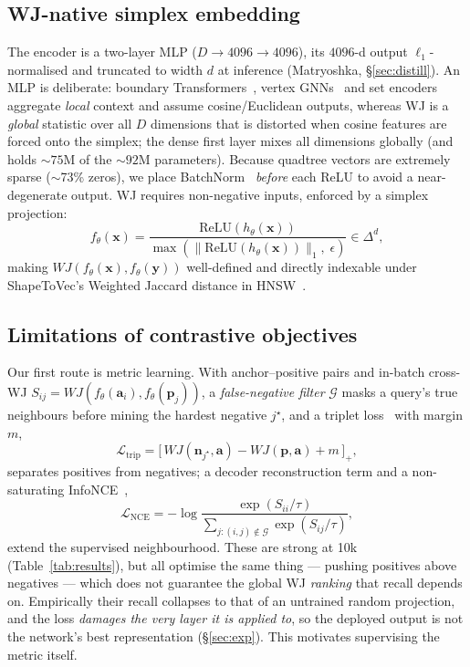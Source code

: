 \documentclass[sigconf]{acmart}
\begin{document}
\subsection{WJ-native simplex embedding}
\label{sec:embed}
The encoder is a two-layer MLP ($D\!\to\!4096\!\to\!4096$), its $4096$-d output
$\ell_1$-normalised and truncated to width $d$ at inference (Matryoshka,
\S\ref{sec:distill}). An MLP is deliberate: boundary Transformers~\cite{mai22}, vertex GNNs~\cite{polygongnn24}
and set encoders~\cite{deepsets17} aggregate \emph{local} context and assume
cosine/Euclidean outputs, whereas WJ is a \emph{global} statistic over all $D$
dimensions that is distorted when cosine features are forced onto the simplex; the
dense first layer mixes all dimensions globally (and holds ${\sim}75$M of the
${\sim}92$M parameters). Because quadtree vectors are extremely sparse
($\sim$73\% zeros), we place BatchNorm~\cite{ioffe15bn} \emph{before} each ReLU to
avoid a near-degenerate output. WJ requires non-negative inputs, enforced by a
simplex projection:
\begin{equation}
  f_\theta(\mathbf{x}) = \frac{\mathrm{ReLU}(h_\theta(\mathbf{x}))}
       {\max(\|\mathrm{ReLU}(h_\theta(\mathbf{x}))\|_1,\;\epsilon)} \in \Delta^{d},
  \label{eq:simplex}
\end{equation}
making $WJ(f_\theta(\mathbf{x}),f_\theta(\mathbf{y}))$ well-defined and directly
indexable under ShapeToVec's Weighted Jaccard distance in HNSW~\cite{shape2vec}.

\subsection{Limitations of contrastive objectives}
\label{sec:contrastive}
Our first route is metric learning. With anchor--positive pairs and in-batch
cross-WJ $S_{ij}=WJ(f_\theta(\mathbf{a}_i),f_\theta(\mathbf{p}_j))$, a
\emph{false-negative filter} $\mathcal{G}$ masks a query's true neighbours before
mining the hardest negative $j^\star$, and a triplet loss~\cite{schroff15} with
margin $m$,
\begin{equation}
  \mathcal{L}_{\mathrm{trip}}=\big[\,WJ(\mathbf{n}_{j^\star},\mathbf{a})
     -WJ(\mathbf{p},\mathbf{a})+m\,\big]_{+},
  \label{eq:triplet}
\end{equation}
separates positives from negatives; a decoder reconstruction term and a
non-saturating InfoNCE~\cite{oord18},
\begin{equation}
  \mathcal{L}_{\mathrm{NCE}}=-\log\frac{\exp(S_{ii}/\tau)}
       {\sum_{j:(i,j)\notin\mathcal{G}}\exp(S_{ij}/\tau)},
  \label{eq:infonce}
\end{equation}
extend the supervised neighbourhood. These are strong at 10k (Table~\ref{tab:results}),
but all optimise the same thing --- pushing positives above negatives --- which does
not guarantee the global WJ \emph{ranking} that recall depends on.
Empirically their recall collapses to that of an untrained random projection, and
the loss \emph{damages the very layer it is applied to}, so the deployed output is
not the network's best representation (\S\ref{sec:exp}). This motivates supervising
the metric itself.
\end{document}
